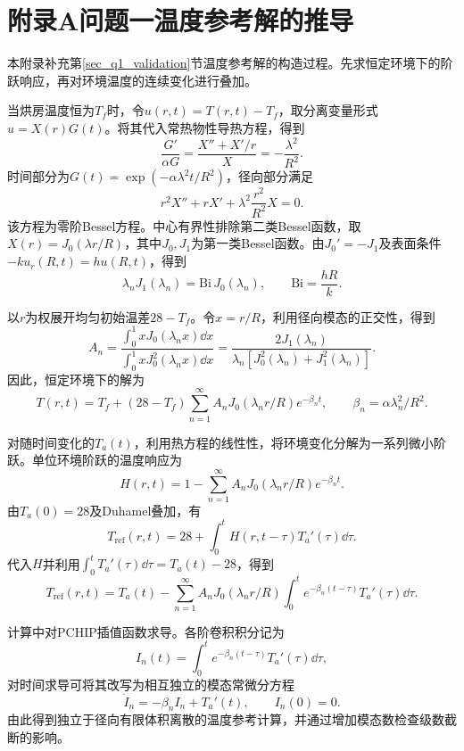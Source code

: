 \section*{附录A\quad 问题一温度参考解的推导}

本附录补充第\ref{sec_q1_validation}节温度参考解的构造过程。先求恒定环境下的阶跃响应，再对环境温度的连续变化进行叠加。

当烘房温度恒为$T_f$时，令$u(r,t)=T(r,t)-T_f$，取分离变量形式$u=X(r)G(t)$。将其代入常热物性导热方程，得到
\[
\frac{G'}{\alpha G}=\frac{X''+X'/r}{X}
=-\frac{\lambda^2}{R^2}.
\]
时间部分为$G(t)=\exp(-\alpha\lambda^2t/R^2)$，径向部分满足
\[
r^2X''+rX'+\lambda^2\frac{r^2}{R^2}X=0.
\]
该方程为零阶Bessel方程。中心有界性排除第二类Bessel函数，取$X(r)=J_0(\lambda r/R)$，其中$J_0,J_1$为第一类Bessel函数。由$J_0'=-J_1$及表面条件$-ku_r(R,t)=hu(R,t)$，得到
\begin{equation}\label{eq_bessel}
\lambda_nJ_1(\lambda_n)=\mathrm{Bi}\,J_0(\lambda_n),\qquad
\mathrm{Bi}=\frac{hR}{k}.
\end{equation}

以$r$为权展开均匀初始温差$28-T_f$。令$x=r/R$，利用径向模态的正交性，得到
\[
A_n=\frac{\int_0^1xJ_0(\lambda_nx)\dd x}
{\int_0^1xJ_0^2(\lambda_nx)\dd x}
=\frac{2J_1(\lambda_n)}{\lambda_n[J_0^2(\lambda_n)+J_1^2(\lambda_n)]}.
\]
因此，恒定环境下的解为
\[
T(r,t)=T_f+(28-T_f)\sum_{n=1}^{\infty}
A_nJ_0(\lambda_nr/R)e^{-\beta_nt},
\qquad\beta_n=\alpha\lambda_n^2/R^2.
\]

对随时间变化的$T_a(t)$，利用热方程的线性性，将环境变化分解为一系列微小阶跃。单位环境阶跃的温度响应为
\[
H(r,t)=1-\sum_{n=1}^{\infty}A_nJ_0(\lambda_nr/R)e^{-\beta_nt}.
\]
由$T_a(0)=28$及Duhamel叠加，有
\[
T_{\mathrm{ref}}(r,t)=28+\int_0^tH(r,t-\tau)T_a'(\tau)\dd\tau.
\]
代入$H$并利用$\int_0^tT_a'(\tau)\dd\tau=T_a(t)-28$，得到
\begin{equation}\label{eq_duhamel}
T_{\mathrm{ref}}(r,t)=T_a(t)-\sum_{n=1}^{\infty}A_nJ_0(\lambda_nr/R)
\int_0^t e^{-\beta_n(t-\tau)}T_a'(\tau)\dd\tau.
\end{equation}

计算中对PCHIP插值函数求导。各阶卷积积分记为
\[
I_n(t)=\int_0^te^{-\beta_n(t-\tau)}T_a'(\tau)\dd\tau,
\]
对时间求导可将其改写为相互独立的模态常微分方程
\[
\dot I_n=-\beta_nI_n+T_a'(t),\qquad I_n(0)=0.
\]
由此得到独立于径向有限体积离散的温度参考计算，并通过增加模态数检查级数截断的影响。

